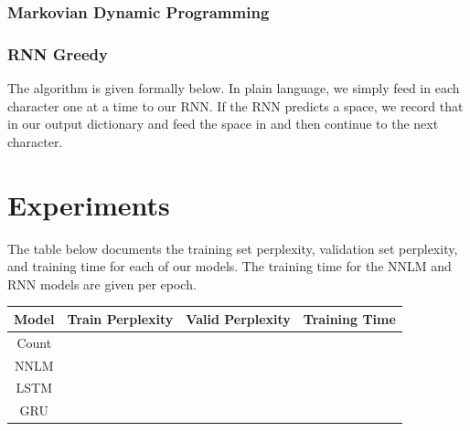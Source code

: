 \documentclass[11pt]{article}
\begin{document}
\subsubsection{Markovian Dynamic Programming}

\subsubsection{RNN Greedy}

The algorithm is given formally below. In plain language, we simply feed in each character one at a time to our RNN. If the RNN predicts a space, we record that in our output dictionary and feed the space in and then continue to the next character. 

\begin{algorithmic}
      \EndIf{}
      \EndIf{}
    \EndWhile{}
  \EndProcedure{}
\end{algorithmic}

\section{Experiments}

The table below documents the training set perplexity, validation set perplexity, and training time for each of our models. The training time for the NNLM and RNN models are given per epoch. 

\begin{center}
  \begin{tabular}{| c | c | c | c |}
    \hline Model & Train Perplexity & Valid Perplexity & Training Time \\
    \hline Count & & & \\
    NNLM & & & \\
    LSTM & & & \\
    GRU & & & \\
    \hline
  \end{tabular}
\end{center}
\end{document}
